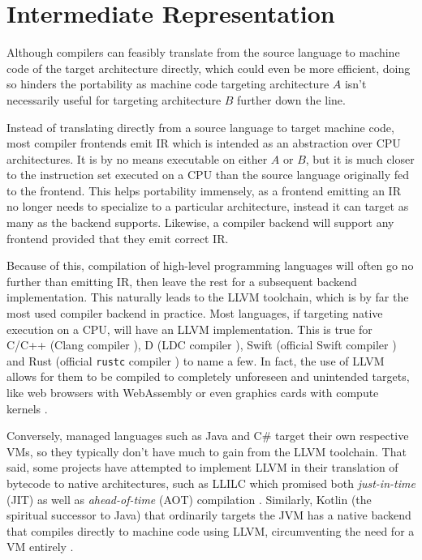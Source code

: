 \documentclass{article}
\begin{document}



\section{Intermediate Representation}


Although compilers can feasibly translate from the source language to machine code of the target architecture directly, which could even be more efficient, doing so hinders the portability as machine code targeting architecture \(A\) isn't necessarily useful for targeting architecture \(B\) further down the line.

Instead of translating directly from a source language to target machine code, most compiler frontends emit IR which is intended as an abstraction over CPU architectures. %
It is by no means executable on either \(A\) or \(B\), but it is much closer to the instruction set executed on a CPU than the source language originally fed to the frontend.  This helps portability immensely, as a frontend emitting an IR no longer needs to specialize to a particular architecture, instead it can target as many as the backend supports.
Likewise, a compiler backend will support any frontend provided that they emit correct IR.

Because of this, compilation of high-level programming languages will often go no further than emitting IR, then leave the rest for a subsequent backend implementation. This naturally leads to the LLVM toolchain, which is by far the most used compiler backend in practice. Most languages, if targeting native execution on a CPU, will have an LLVM implementation. This is true for C/C++ (Clang compiler \cite{clang}), D (LDC compiler \cite{dlang}), Swift (official Swift compiler \cite{swift}) and Rust (official \texttt{rustc} compiler \cite{rustc}) to name a few. In fact, the use of LLVM allows for them to be compiled to completely unforeseen and unintended targets, like web browsers with WebAssembly or even graphics cards with compute kernels \cite{backend}.

Conversely, managed languages such as Java and C\# target their own respective VMs, so they typically don't have much to gain from the LLVM toolchain. That said, some projects have attempted to implement LLVM in their translation of bytecode to native architectures,  such as LLILC which promised both \textit{just-in-time} (JIT) as well as \textit{ahead-of-time} (AOT) compilation \cite{dotnet}. Similarly, Kotlin (the spiritual successor to Java) that ordinarily targets the JVM has a native backend that compiles directly to machine code using LLVM, circumventing the need for a VM entirely \cite{kotlin}.
\end{document}
